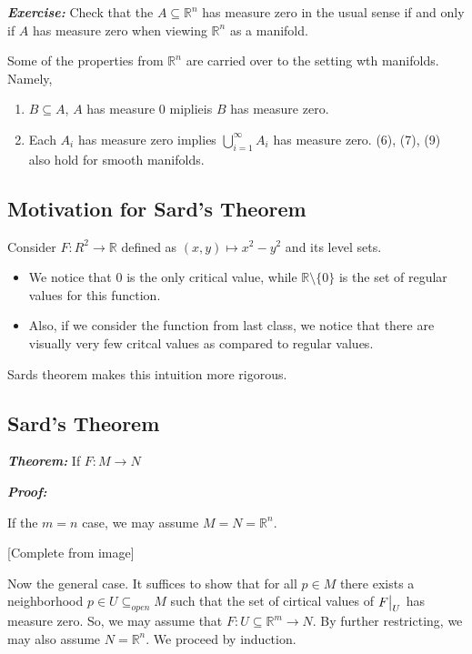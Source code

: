 \documentclass{article}
\newcommand{\R}{\mathbb{R}}
\newcommand{\restr}[2]{{%
  \left.\kern-\nulldelimiterspace %
  #1 %
  \vphantom{\big|} %
  \right|_{#2} %
  }}
\begin{document}
\vskip 0.5cm
\begin{dottedbox}
  \emph{\textbf{Exercise:}} Check that the $A \subseteq \R^n$ has measure zero in the usual sense if and only if $A$ has measure zero when viewing $\R^n$ as a manifold.
\end{dottedbox}

\vskip 0.5cm
Some of the properties from $\R^n$ are carried over to the setting wth manifolds. Namely, 
\begin{enumerate}
  \item $B \subseteq A$, $A$ has measure 0 miplieis $B$ has measure zero.
  \item Each $A_i$ has measure zero implies $\bigcup_{i = 1}^{\infty} A_i$ has measure zero.
  \vskip 0.5cm
  (6), (7), (9) also hold for smooth manifolds.
\end{enumerate}

\vskip 1cm
\subsection{Motivation for Sard's Theorem}

Consider $F : R^2 \rightarrow \R$ defined as $(x,y) \mapsto x^2 - y^2$ and its level sets. 
\begin{itemize}
  \item We notice that $0$ is the only critical value, while $\R \setminus \{0\}$ is the set of regular values for this function.
  \item Also, if we consider the function from last class, we notice that there are visually very few critcal values as compared to regular values.
\end{itemize}
Sards theorem makes this intuition more rigorous.

\vskip 1cm
\subsection{Sard's Theorem}

\begin{dottedbox}
  \emph{\textbf{Theorem:}} If $F : M \rightarrow N$
\end{dottedbox}

\vskip 0.5cm
\emph{\textbf{Proof:}}

If the $m=n$ case, we may assume $M = N = \R^n$.

[Complete from image]

\vskip 1cm
Now the general case. It suffices to show that for all $p \in M$ there exists a neighborhood $p \in U \subseteq_{open} M$ such that the set of cirtical values of $\restr{F}{U}$ has measure zero. So, we may assume that $F : U \subseteq \R^m \rightarrow N$. By further restricting, we may also assume $N = \R^n$. We proceed by induction.
\end{document}
